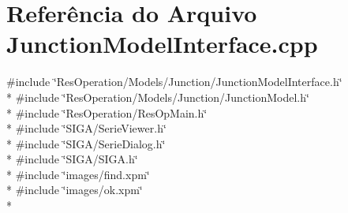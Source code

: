 \section{Referência do Arquivo Junction\+Model\+Interface.\+cpp}
\label{_junction_model_interface_8cpp}
{\ttfamily \#include \char`\"{}Res\+Operation/\+Models/\+Junction/\+Junction\+Model\+Interface.\+h\char`\"{}}\\*
{\ttfamily \#include \char`\"{}Res\+Operation/\+Models/\+Junction/\+Junction\+Model.\+h\char`\"{}}\\*
{\ttfamily \#include \char`\"{}Res\+Operation/\+Res\+Op\+Main.\+h\char`\"{}}\\*
{\ttfamily \#include \char`\"{}S\+I\+G\+A/\+Serie\+Viewer.\+h\char`\"{}}\\*
{\ttfamily \#include \char`\"{}S\+I\+G\+A/\+Serie\+Dialog.\+h\char`\"{}}\\*
{\ttfamily \#include \char`\"{}S\+I\+G\+A/\+S\+I\+G\+A.\+h\char`\"{}}\\*
{\ttfamily \#include \char`\"{}images/find.\+xpm\char`\"{}}\\*
{\ttfamily \#include \char`\"{}images/ok.\+xpm\char`\"{}}\\*
